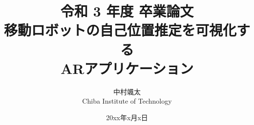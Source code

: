 \documentclass[a4paper,11pt]{jsbook}
\begin{document}
\title{令和 3 年度 卒業論文\\
移動ロボットの自己位置推定を可視化する\\
ARアプリケーション}

\author{中村颯太 \\
Chiba Institute of Technology}

\date{20xx年x月x日}

\maketitle





\tableofcontents



\cleardoublepage
{}


%
%
%

\appendix





\newpage
\printindex
\end{document}
